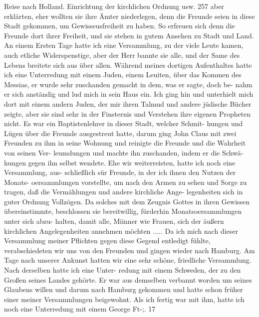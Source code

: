 Reise nach Holland. Einrichtung der kirchlichen Ordnung usw. 257
aber erklärten, eher wollten sie ihre Ämter niederlegen, denn die
Freunde seien in diese Stadt gekommen, um Gewisseusfreiheit zu
haben. So erfreuen sich denn die Freunde dort ihrer Freiheit,
und sie stehen in gutem Ansehen zu Stadt und Land.
An einem Ersten Tage hatte ich eine Versammlung, zu der
viele Leute kamen, auch etliche Widerspenstige, aber der Herr bannte
sie alle, und der Same des Lebens breitete sich aus über allen.
Während meines dortigen Aufenthaltes hatte ich eine Unterredung
mit einem Juden, einem Leuiten, über das Kommen des Messias,
er wurde sehr zuschanden gemacht in dem, was er sagte, doch be-
nahm er sich anständig und lud mich in sein Haus ein. Ich ging
hin und unterhielt mich dort mit einem andern Juden, der mir
ihren Talmud und andere jüdische Bücher zeigte, aber sie sind
sehr in der Finsternis und Verstehen ihre eigenen Propheten nicht.
Es war ein Baptistenlehrer in dieser Stadt, welcher Schmit-
hungen und Lügen über die Freunde ausgestreut hatte, darum
ging John Claus mit zwei Freunden zu ihm in seine Wohnung
und reinigte die Freunde und die Wahrheit von seinen Ver-
leumdungen und machte ihn zuschanden, indem er die Schwä-
hungen gegen ihn selbst wendete.
Ehe wir weiterreisten, hatte ich noch eine Versammlung, aus-
schließlich sür Freunde, in der ich ihnen den Nutzen der Monats-
oersammlungen vorstellte, um nach den Armen zu sehen und Sorge
zu tragen, daß die Vermählungen und andere kirchliche Ange-
legenheiten sich in guter Ordnung Vollzögen. Da solches mit dem
Zeugnis Gottes in ihren Gewissen übereinstimmte, beschlossen sie
bereitwillig, fürderhin Monatsoersammlungen unter sich abzu-
halten, damit alle, Miinner wie Frauen, sich der äußern kirchlichen
Angelegenheiten annehmen möchten .....
Da ich mich nach dieser Versammlung meiner Pflichten gegen
diese Gegend entledigt fühlte, verabschiedeten wir uns von den
Freunden und gingen wieder nach Hamburg.
Am Tage nach unserer Ankunst hatten wir eine sehr schöne,
friedliche Versammlung. Nach derselben hatte ich eine Unter-
redung mit einem Schweden, der zu den Großen seines Landes
gehörte. Er war aus demselben verbannt worden um seines
Glaubens willen und darum nach Hamburg gekommen und hatte
schon früher einer meiner Versammlungen beigewohnt. Als ich
fertig war mit ihm, hatte ich noch eine Unterredung mit einem
George Ft-;. 17


